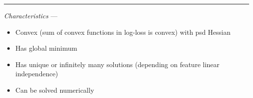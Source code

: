 {\color{lightgray}\hrule height 0.001mm}

\emph{Characteristics} --- 
\begin{itemize}
    \item Convex (sum of convex functions in log-loss is convex) with psd Hessian
    \item Has global minimum
    \item Has unique or infinitely many solutions (depending on feature linear independence)
    \item Can be solved numerically
\end{itemize}